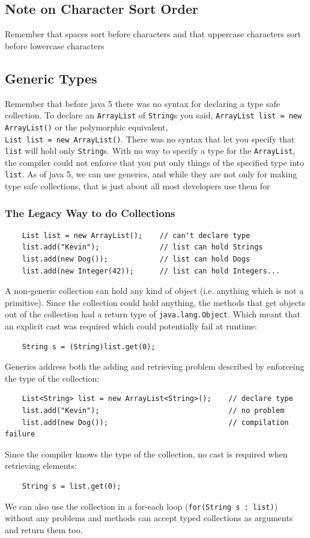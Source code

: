 \subsection{Note on Character Sort Order}
Remember that spaces sort before characters and that uppercase characters sort 
before lowercase characters

\subsection{Generic Types}
Remember that before java 5 there was no syntax for declaring a type safe 
collection. To declare an \verb#ArrayList# of \verb#String#s you said, 
\verb#ArrayList list = new ArrayList()# or the polymorphic equivalent,\\ 
\verb#List list = new ArrayList()#. There was no syntax that let you specify 
that \verb#list# will hold only \verb#String#s. With no way to specify a type 
for the \verb#ArrayList#, the compiler could not enforce that you put only 
things of the specified type into \verb#list#. As of java 5, we can use 
generics, and while they are not only for making type safe collections, that is 
just about all most developers use them for

\subsubsection{The Legacy Way to do Collections}
\begin{verbatim}
    List list = new ArrayList();    // can't declare type
    list.add("Kevin");              // list can hold Strings
    list.add(new Dog());            // list can hold Dogs
    list.add(new Integer(42));      // list can hold Integers...
\end{verbatim}
A non-generic collection can hold any kind of object (i.e. anything which is 
not a primitive). Since the collection could hold anything, the methods that 
get objects out of the collection had a return type of \verb#java.lang.Object#.  
Which meant that an explicit cast was required which could potentially fail at 
runtime:
\begin{verbatim}
    String s = (String)list.get(0);
\end{verbatim}
Generics address both the adding and retrieving problem described by enforceing 
the type of the collection:
\begin{verbatim}
    List<String> list = new ArrayList<String>();    // declare type
    list.add("Kevin");                              // no problem
    list.add(new Dog());                            // compilation failure
\end{verbatim}
Since the compiler knows the type of the collection, no cast is required when 
retrieving elements:
\begin{verbatim}
    String s = list.get(0);
\end{verbatim}
We can also use the collection in a for-each loop (\verb#for(String s : list)#) 
without any problems and methods can accept typed collections as arguments and 
return them too.

